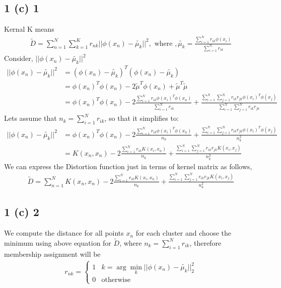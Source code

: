 \documentclass[10pt,letterpaper]{article}
\begin{document}
\subsection{1 (c) 1} Kernal K means
			\begin{align*}
			\tilde{D} = \sum_{n=1}^N\sum_{k=1}^K r_{nk} ||\phi(x_n) - \tilde{\mu_k}||^2,	\text{   where },
			\tilde{\mu_k} = \frac{\sum_{i=1}^N r_{ik}\phi(x_i)}{\sum_{i=1}^N r_{ik}}
			\end{align*}
			Consider, $||\phi(x_n) - \tilde{\mu_k}||^2$
			\begin{align*}
			||\phi(x_n) - \tilde{\mu_k}||^2 &= (\phi(x_n)- \tilde{\mu_k})^T(\phi(x_n)-\tilde{\mu_k})\\
			&=\phi(x_n)^T\phi(x_n) - 2\tilde{\mu}^T\phi(x_n) + \tilde{\mu}^T\tilde{\mu}\\
			&= \phi(x_n)^T\phi(x_n) -2 \frac{\sum_{i=1}^N r_{ik}\phi(x_i)^T\phi(x_n)}{\sum_{i=1}^N r_{ik}} + \frac{\sum_{i=1}^N \sum_{j=1}^Nr_{ik}r_{jk}\phi(x_i)^T\phi(x_j)}{\sum_{i=1}^N \sum_{j=1}^N r_{ik}r_{jk}}
			\end{align*}
		Lets assume that $n_k = \sum_{i=1}^N r_{ik}$, so that it simplifies to:
		\begin{align*}
		||\phi(x_n) - \tilde{\mu_k}||^2 &= \phi(x_n)^T\phi(x_n) -2 \frac{\sum_{i=1}^N r_{ik}\phi(x_i)^T\phi(x_n)}{n_k} + \frac{\sum_{i=1}^N \sum_{j=1}^Nr_{ik}r_{jk}\phi(x_i)^T\phi(x_j)}{n_k^2}\\
		&= K(x_n,x_n) -2 \frac{\sum_{i=1}^N r_{ik} K(x_i, x_n)}{n_k} + \frac{\sum_{i=1}^N \sum_{j=1}^Nr_{ik}r_{jk}K(x_i,x_j)}{n_k^2}
		\end{align*}
We can express the Distortion function just in terms of kernel matrix as follows,
			\begin{align*}
			\tilde{D} = \sum_{n=1}^N K(x_n,x_n) -2 \frac{\sum_{i=1}^N r_{ik} K(x_i, x_n)}{n_k} + \frac{\sum_{i=1}^N \sum_{j=1}^Nr_{ik}r_{jk}K(x_i,x_j)}{n_k^2}
			\end{align*}
\subsection{1 (c) 2}
 We compute the distance for all points $x_n$ for each cluster and choose the minimum using above equation for $\tilde{D}$, where  $n_k = \sum_{i=1}^N r_{ik}$, therefore membership assignment will be
\begin{align*}
	r_{nk} = \begin{cases}
	1 & k = \arg \min_k ||\phi(x_n)-\tilde{\mu_k}||_2^2\\
	0 & \text{otherwise}
	\end{cases}
\end{align*}
\end{document}
